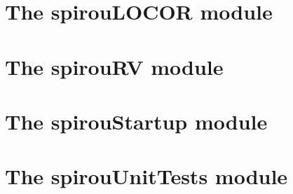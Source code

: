 \section{The spirouLOCOR module}
\label{ch:the_module:spirouLOCOR}


\section{The spirouRV module}
\label{ch:the_module:spirouRV}


\section{The spirouStartup module}
\label{ch:the_module:spirouStartup}


\section{The spirouUnitTests module}
\label{ch:the_module:spirouUnitTests}
